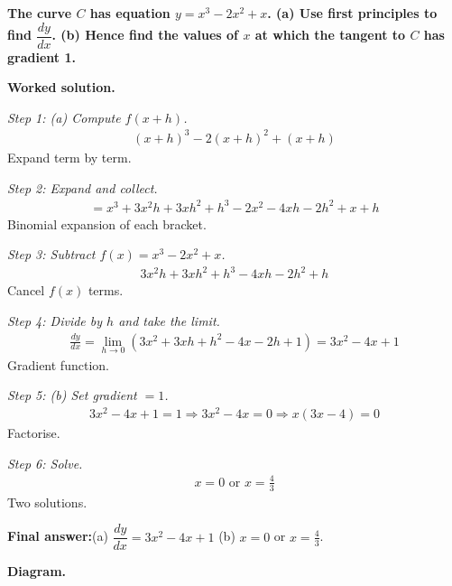 \documentclass[11pt]{article}
\newcommand{\question}[1]{\par\medskip\noindent\textbf{#1}\par}
\begin{document}
\question{The curve \( C \) has equation \( y = x^3 - 2x^2 + x \). (a) Use first principles to find \( \dfrac{dy}{dx} \). (b) Hence find the values of \( x \) at which the tangent to \( C \) has gradient 1.}

\textbf{Worked solution.}

\textit{Step 1: (a) Compute \( f(x+h) \).}
\[\begin{gathered}
(x+h)^3 - 2(x+h)^2 + (x+h)
\end{gathered}\]
Expand term by term.

\textit{Step 2: Expand and collect.}
\[\begin{gathered}
= x^3 + 3x^2h + 3xh^2 + h^3 - 2x^2 - 4xh - 2h^2 + x + h
\end{gathered}\]
Binomial expansion of each bracket.

\textit{Step 3: Subtract \( f(x) = x^3 - 2x^2 + x \).}
\[\begin{gathered}
3x^2 h + 3xh^2 + h^3 - 4xh - 2h^2 + h
\end{gathered}\]
Cancel \( f(x) \) terms.

\textit{Step 4: Divide by \( h \) and take the limit.}
\[\begin{gathered}
\frac{dy}{dx} = \lim_{h \to 0}(3x^2 + 3xh + h^2 - 4x - 2h + 1) = 3x^2 - 4x + 1
\end{gathered}\]
Gradient function.

\textit{Step 5: (b) Set gradient \( = 1 \).}
\[\begin{gathered}
3x^2 - 4x + 1 = 1 \Rightarrow 3x^2 - 4x = 0 \Rightarrow x(3x - 4) = 0
\end{gathered}\]
Factorise.

\textit{Step 6: Solve.}
\[\begin{gathered}
x = 0 \text{ or } x = \tfrac{4}{3}
\end{gathered}\]
Two solutions.

\begin{answerbox}
\textbf{Final answer:}\quad (a) \(\displaystyle  \dfrac{dy}{dx} = 3x^2 - 4x + 1 \) \quad  (b) \(\displaystyle  x = 0 \) or \(\displaystyle  x = \tfrac{4}{3} \).
\end{answerbox}
\textbf{Diagram.}
\end{document}
